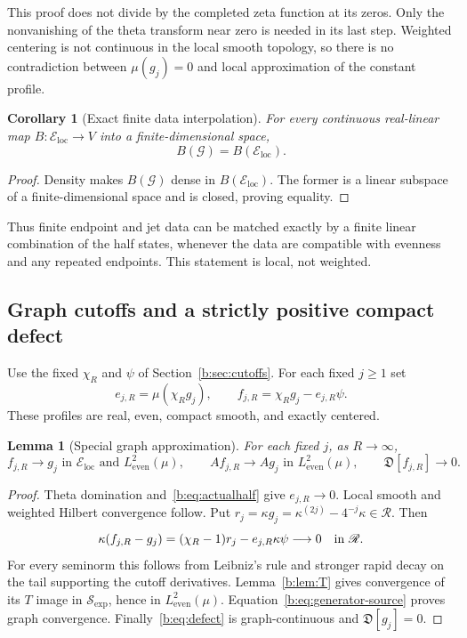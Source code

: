 \documentclass[11pt,a4paper]{article}
\numberwithin{equation}{section}
\newtheorem{lemma}[theorem]{Lemma}
\newtheorem{corollary}[theorem]{Corollary}
\theoremstyle{definition}\newtheorem{definition}[theorem]{Definition}
\theoremstyle{remark}\newtheorem{remark}[theorem]{Remark}
\newcommand{\He}{L^2_{\mathrm{even}}(\mu)}\newcommand{\Le}{L^2_{\mathrm{even}}(dx)}
\newcommand{\RR}{\mathscr R}\newcommand{\SSS}{\mathcal S_{\!\exp}}\newcommand{\CE}{\mathcal C_{\exp}}
\newcommand{\Eloc}{\mathcal E_{\mathrm{loc}}}\newcommand{\Def}{\mathfrak D}
\begin{document}
This proof does not divide by the completed zeta function at its zeros. Only the nonvanishing of the theta transform near zero is needed in its last step. Weighted centering is not continuous in the local smooth topology, so there is no contradiction between $\mu(g_j)=0$ and local approximation of the constant profile.

\begin{corollary}[Exact finite data interpolation]\label{b:cor:finiteimage}
For every continuous real-linear map $B:\Eloc\to V$ into a finite-dimensional space,
\[
 B(\mathcal G)=B(\Eloc).
\]
\end{corollary}
\begin{proof}
Density makes $B(\mathcal G)$ dense in $B(\Eloc)$. The former is a linear subspace of a finite-dimensional space and is closed, proving equality.
\end{proof}

Thus finite endpoint and jet data can be matched exactly by a finite linear combination of the half states, whenever the data are compatible with evenness and any repeated endpoints. This statement is local, not weighted.

\subsection{Graph cutoffs and a strictly positive compact defect}\label{b:sec:graph}

Use the fixed $\chi_R$ and $\psi$ of Section~\ref{b:sec:cutoffs}. For each fixed $j\ge1$ set
\begin{equation}\label{b:eq:fjR}
 e_{j,R}=\mu(\chi_Rg_j),\qquad
 f_{j,R}=\chi_Rg_j-e_{j,R}\psi.
\end{equation}
These profiles are real, even, compact smooth, and exactly centered.

\begin{lemma}[Special graph approximation]\label{b:lem:graph}
For each fixed $j$, as $R\to\infty$,
\[
 f_{j,R}\to g_j\text{ in }\Eloc\text{ and }\He,
 \qquad Af_{j,R}\to Ag_j\text{ in }\He,
 \qquad\Def[f_{j,R}]\to0.
\]
\end{lemma}
\begin{proof}
Theta domination and~\eqref{b:eq:actualhalf} give $e_{j,R}\to0$. Local smooth and weighted Hilbert convergence follow. Put $r_j=\kappa g_j=\kappa^{(2j)}-4^{-j}\kappa\in\RR$. Then
\[
 \kappa(f_{j,R}-g_j)=(\chi_R-1)r_j-e_{j,R}\kappa\psi\longrightarrow0
 \quad\hbox{in }\RR.
\]
For every seminorm this follows from Leibniz's rule and stronger rapid decay on the tail supporting the cutoff derivatives. Lemma~\ref{b:lem:T} gives convergence of its $T$ image in $\SSS$, hence in $\He$. Equation~\eqref{b:eq:generator-source} proves graph convergence. Finally~\eqref{b:eq:defect} is graph-continuous and $\Def[g_j]=0$.
\end{proof}
\end{document}
